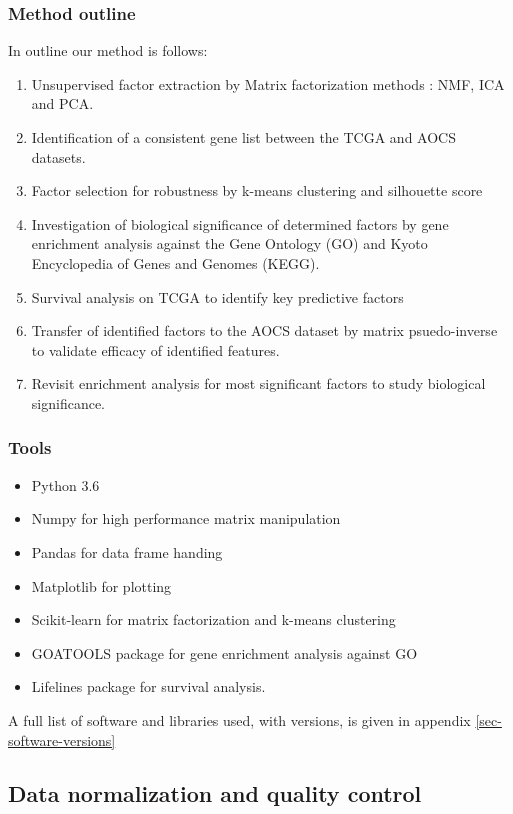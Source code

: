 \documentclass[draft, tikz, 12pt,a4paper,oneside,fleqn]{article}
\begin{document}
\subsubsection{Method outline}
In outline our method is follows:
\begin{enumerate}
\item
Unsupervised factor extraction by Matrix
factorization methods : NMF, ICA and PCA.
\item
Identification of a consistent gene list between the TCGA and AOCS datasets.
\item
Factor selection for robustness by
k-means clustering and silhouette score
\item
Investigation of biological significance of determined factors by gene enrichment analysis against the Gene Ontology (GO) and Kyoto Encyclopedia of Genes and Genomes (KEGG).
\item
Survival analysis on TCGA to identify key predictive factors
\item
Transfer of identified factors to the AOCS dataset by matrix psuedo-inverse to validate efficacy of identified features.
\item
Revisit enrichment analysis for most significant factors to study biological significance.
\end{enumerate}

\subsubsection{Tools}
\begin{itemize}
\item Python 3.6
\item Numpy for high performance matrix manipulation
\item Pandas for data frame handing
\item Matplotlib for plotting
\item Scikit-learn for matrix factorization and k-means clustering
\item GOATOOLS package for gene enrichment analysis against GO
\item Lifelines package for survival analysis.
\end{itemize}

A full list of software and libraries used, with versions, is given in appendix \ref{sec-software-versions}

\subsection{Data normalization and quality control}
\end{document}
